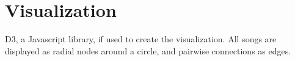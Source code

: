 \section{Visualization}

D3, a Javascript library, if used to create the visualization. All songs are displayed as radial nodes around a circle, and pairwise connections as edges.